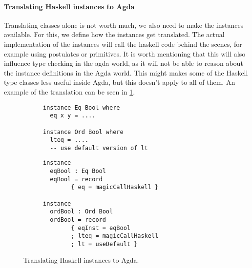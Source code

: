 \documentclass[12pt, a4paper, twoside]{report}
\begin{document}
\paragraph{Translating Haskell instances to Agda}
Translating classes alone is not worth much, we also need to make the
instances available. For this, we define how the instances get translated.
The actual implementation of the instances will call the haskell code
behind the scenes, for example using postulates or primitives. It is worth mentioning
that this will also influence type checking in the agda world, as it will not be
able to reason about the instance definitions in the Agda world. This might makes some
of the Haskell type classes less useful inside Agda, but this doesn't apply to all of them.
An example of the translation can be seen in \ref{lst:inst-hs-agda}.
\begin{figure}
\begin{subfigure}[b]{0.5\textwidth}
\begin{lstlisting}
instance Eq Bool where
  eq x y = ....

instance Ord Bool where
  lteq = ....
  -- use default version of lt
\end{lstlisting}
\end{subfigure}
\hspace{10pt}
\begin{subfigure}[b]{0.5\textwidth}
\begin{lstlisting}
instance
  eqBool : Eq Bool
  eqBool = record
        { eq = magicCallHaskell }

instance
  ordBool : Ord Bool
  ordBool = record
        { eqInst = eqBool
        ; lteq = magicCallHaskell
        ; lt = useDefault }
\end{lstlisting}
\end{subfigure}
\caption{Translating Haskell instances to Agda.}
\label{lst:inst-hs-agda}
\end{figure}
\end{document}
